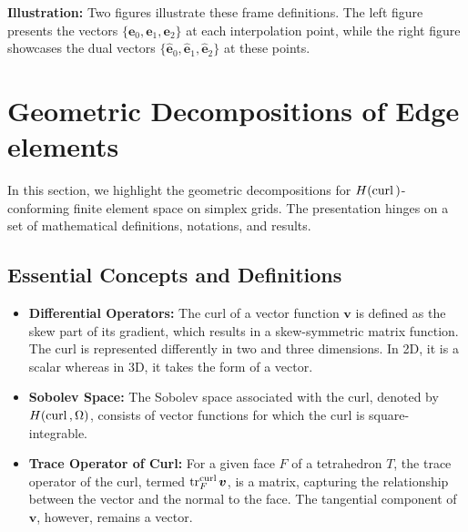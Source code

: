 \documentclass[12pt, a4paper]{article}
\newcommand{\bs}{\boldsymbol}
\newcommand{\curl}{{\rm curl\,}}
\begin{document}
\textbf{Illustration:} Two figures illustrate these frame definitions. The left
figure presents the vectors $\{\bs e_0, \bs e_1, \bs e_2\}$ at each
interpolation point, while the right figure showcases the dual vectors $\{\hat{
\bs e}_0, \hat{ \bs e}_1, \hat{\bs e}_2\}$ at these points.


\section{Geometric Decompositions of Edge elements}

In this section, we highlight the geometric decompositions for
$H(\curl)$-conforming finite element space on simplex grids. The presentation
hinges on a set of mathematical definitions, notations, and results.

\subsection{Essential Concepts and Definitions}
\begin{itemize}
    \item \textbf{Differential Operators:} The curl of a vector function
        $\boldsymbol{v}$ is defined as the skew part of its gradient, which
        results in a skew-symmetric matrix function. The curl is represented
        differently in two and three dimensions. In 2D, it is a scalar whereas
        in 3D, it takes the form of a vector.
    
    \item \textbf{Sobolev Space:} The Sobolev space associated with the curl,
        denoted by $H(\curl,\Omega)$, consists of vector functions for which the
        curl is square-integrable.
    
    \item \textbf{Trace Operator of Curl:} For a given face $F$ of a tetrahedron
        $T$, the trace operator of the curl, termed ${\rm
        tr}_F^{\curl}\boldsymbol v$, is a matrix, capturing the relationship
        between the vector and the normal to the face. The tangential component
        of $\boldsymbol v$, however, remains a vector.
\end{itemize}
\end{document}
